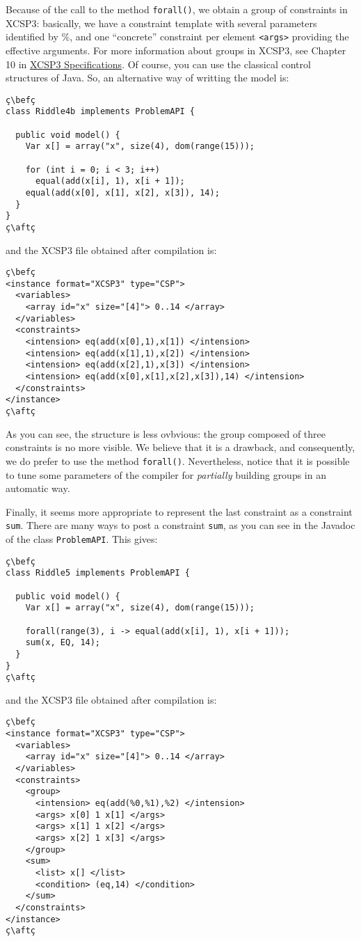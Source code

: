 \documentclass[10pt]{article}
\def\xt{{\rm XCSP3}\xspace}
\newcommand{\xml}[1]{{\tt <#1>}} %
\newcommand{\gb}[1]{{\tt #1}} %
\newcommand{\nn}[1]{{\tt #1}} %
\def\xt{{\rm XCSP3}\xspace}
\def\bef{\rule{10cm}{0.1mm}} %
\def\aft{\rule{10cm}{0.1mm}\medskip}
\begin{document}
Because of the call to the method \nn{forall()}, we obtain a group of constraints in \xt: basically, we have a constraint template with several parameters identified by \%,
and one ``concrete'' constraint per element \xml{args} providing the effective arguments.
For more information about groups in \xt, see Chapter 10 in \href{http://www.xcsp.org/format3.pdf}{\xt Specifications}.
Of course, you can use the classical control structures of Java. So, an alternative way of writting the model is:
\begin{lstlisting}
ç\befç
class Riddle4b implements ProblemAPI {

  public void model() {
    Var x[] = array("x", size(4), dom(range(15)));
    
    for (int i = 0; i < 3; i++)
      equal(add(x[i], 1), x[i + 1]);
    equal(add(x[0], x[1], x[2], x[3]), 14);
  }
}
ç\aftç
\end{lstlisting}
and the \xt file obtained after compilation is:
\begin{lstlisting}
ç\befç
<instance format="XCSP3" type="CSP">
  <variables>
    <array id="x" size="[4]"> 0..14 </array>
  </variables>
  <constraints>
    <intension> eq(add(x[0],1),x[1]) </intension>
    <intension> eq(add(x[1],1),x[2]) </intension>
    <intension> eq(add(x[2],1),x[3]) </intension>
    <intension> eq(add(x[0],x[1],x[2],x[3]),14) </intension>
  </constraints>
</instance>
ç\aftç
\end{lstlisting}

As you can see, the structure is less ovbvious: the group composed of three constraints is no more visible.
We believe that it is a drawback, and consequently, we do prefer to use the method \nn{forall()}.
Nevertheless, notice that it is possible to tune some parameters of the compiler for {\em partially} building groups in an automatic way.  

Finally, it seems more appropriate to represent the last constraint as a constraint \gb{sum}. There are many ways to post a constraint \gb{sum}, as you can see in the Javadoc of the class \texttt{ProblemAPI}.
This gives:

\begin{lstlisting}
ç\befç
class Riddle5 implements ProblemAPI {

  public void model() {
    Var x[] = array("x", size(4), dom(range(15)));
    
    forall(range(3), i -> equal(add(x[i], 1), x[i + 1]));
    sum(x, EQ, 14);
  }
}
ç\aftç
\end{lstlisting}
and the \xt file obtained after compilation is:
\begin{lstlisting}
ç\befç
<instance format="XCSP3" type="CSP">
  <variables>
    <array id="x" size="[4]"> 0..14 </array>
  </variables>
  <constraints>
    <group>
      <intension> eq(add(%0,%1),%2) </intension>
      <args> x[0] 1 x[1] </args>
      <args> x[1] 1 x[2] </args>
      <args> x[2] 1 x[3] </args>
    </group>
    <sum>
      <list> x[] </list>
      <condition> (eq,14) </condition>
    </sum>
  </constraints>
</instance>
ç\aftç
\end{lstlisting}
\end{document}
